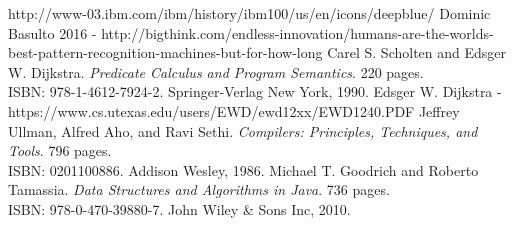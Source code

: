 \documentclass{article}
\begin{document}
\begin{thebibliography}{99}

 http://www-03.ibm.com/ibm/history/ibm100/us/en/icons/deepblue/
 Dominic Basulto 2016 - http://bigthink.com/endless-innovation/humans-are-the-worlds-best-pattern-recognition-machines-but-for-how-long
 Carel S. Scholten and Edsger W. Dijkstra. \emph{Predicate Calculus and Program Semantics}. 220 pages. \\ISBN: 978-1-4612-7924-2. Springer-Verlag New York, 1990.
 Edsger W. Dijkstra - https://www.cs.utexas.edu/users/EWD/ewd12xx/EWD1240.PDF
 Jeffrey Ullman, Alfred Aho, and Ravi Sethi. \emph{Compilers: Principles, Techniques, and Tools}. 796 pages. \\ISBN: 0201100886. Addison Wesley, 1986.
 Michael T. Goodrich and Roberto Tamassia. \emph{Data Structures and Algorithms in Java}. 736 pages. \\ISBN: 978-0-470-39880-7. John Wiley \& Sons Inc, 2010.
\end{thebibliography}
\end{document}
